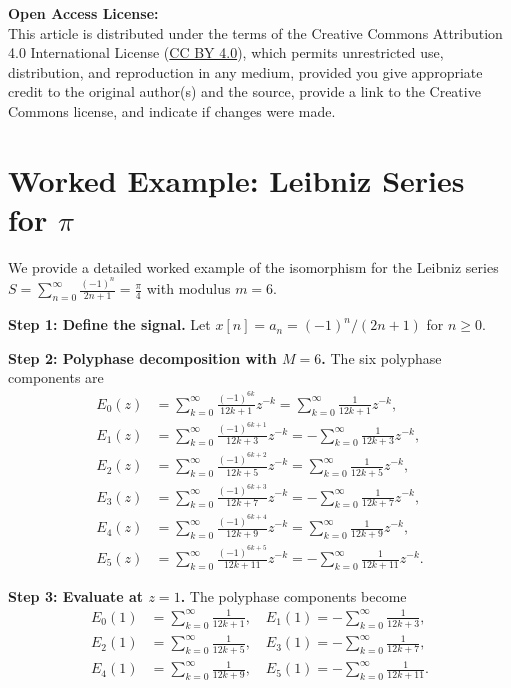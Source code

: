 \documentclass[12pt,a4paper]{article}
\theoremstyle{plain}
\theoremstyle{definition}
\theoremstyle{remark}
\begin{document}
\vspace{1em}
\noindent\textbf{Open Access License:} \\
This article is distributed under the terms of the Creative Commons Attribution 4.0 International License (\href{https://creativecommons.org/licenses/by/4.0/}{CC BY 4.0}), which permits unrestricted use, distribution, and reproduction in any medium, provided you give appropriate credit to the original author(s) and the source, provide a link to the Creative Commons license, and indicate if changes were made.

\appendix
\section{Worked Example: Leibniz Series for \(\pi\)}
\label{app:leibniz}

We provide a detailed worked example of the isomorphism for the Leibniz series \(S = \sum_{n=0}^{\infty} \frac{(-1)^n}{2n+1} = \frac{\pi}{4}\) with modulus \(m=6\).

\textbf{Step 1: Define the signal.} Let \(x[n] = a_n = (-1)^n / (2n+1)\) for \(n \ge 0\).

\textbf{Step 2: Polyphase decomposition with \(M=6\).} The six polyphase components are
\begin{align}
E_0(z) &= \sum_{k=0}^{\infty} \frac{(-1)^{6k}}{12k+1} z^{-k} = \sum_{k=0}^{\infty} \frac{1}{12k+1} z^{-k}, \\
E_1(z) &= \sum_{k=0}^{\infty} \frac{(-1)^{6k+1}}{12k+3} z^{-k} = -\sum_{k=0}^{\infty} \frac{1}{12k+3} z^{-k}, \\
E_2(z) &= \sum_{k=0}^{\infty} \frac{(-1)^{6k+2}}{12k+5} z^{-k} = \sum_{k=0}^{\infty} \frac{1}{12k+5} z^{-k}, \\
E_3(z) &= \sum_{k=0}^{\infty} \frac{(-1)^{6k+3}}{12k+7} z^{-k} = -\sum_{k=0}^{\infty} \frac{1}{12k+7} z^{-k}, \\
E_4(z) &= \sum_{k=0}^{\infty} \frac{(-1)^{6k+4}}{12k+9} z^{-k} = \sum_{k=0}^{\infty} \frac{1}{12k+9} z^{-k}, \\
E_5(z) &= \sum_{k=0}^{\infty} \frac{(-1)^{6k+5}}{12k+11} z^{-k} = -\sum_{k=0}^{\infty} \frac{1}{12k+11} z^{-k}.
\end{align}

\textbf{Step 3: Evaluate at \(z=1\).} The polyphase components become
\begin{align}
E_0(1) &= \sum_{k=0}^{\infty} \frac{1}{12k+1}, \quad E_1(1) = -\sum_{k=0}^{\infty} \frac{1}{12k+3}, \\
E_2(1) &= \sum_{k=0}^{\infty} \frac{1}{12k+5}, \quad E_3(1) = -\sum_{k=0}^{\infty} \frac{1}{12k+7}, \\
E_4(1) &= \sum_{k=0}^{\infty} \frac{1}{12k+9}, \quad E_5(1) = -\sum_{k=0}^{\infty} \frac{1}{12k+11}.
\end{align}
\end{document}
